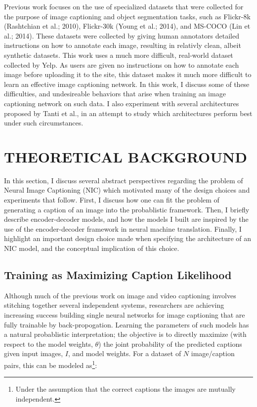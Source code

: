 \documentclass[letterpaper, 10 pt, conference]{ieeeconf}
\begin{document}
Previous work focuses on the use of specialized datasets that were collected for the purpose of image captioning and object segmentation tasks, such as Flickr-8k (Rashtchian et al.; 2010), Flickr-30k (Young et al.; 2014), and MS-COCO (Lin et al.; 2014). These datasets were collected by giving human annotators detailed instructions on how to annotate each image, resulting in relativly clean, albeit synthetic datasets. This work uses a much more difficult, real-world dataset collected by Yelp. As users are given no instructions on how to annotate each image before uploading it to the site, this dataset makes it much more difficult to learn an effective image captioning network. In this work, I discuss some of these difficulties, and undesireable behaviors that arise when training an image captioning network on such data. I also experiment with several architectures proposed by Tanti et al., in an attempt to study which architectures perform best under such circumstances.


\section{THEORETICAL BACKGROUND}

In this section, I discuss several abstract perspectives regarding the problem of Neural Image Captioning (NIC) which motivated many of the design choices and experiments that follow. First, I discuss how one can fit the problem of generating a caption of an image into the probablistic framework. Then, I briefly describe encoder-decoder models, and how the models I built are inspired by the use of the encoder-decoder  framework in neural machine translation. Finally, I highlight an important design choice made when specifying the architecture of an NIC model, and the conceptual implication of this choice. 

\subsection{Training as Maximizing Caption Likelihood}

Although much of the previous work on image and video captioning involves stitching together several independent systems, researchers are achieving increasing success building single neural networks for image captioning that are fully trainable by back-propogation. Learning the parameters of such models has a natural probablistic interpretation; the objective is to directly maximize (with respect to the model weights, $\theta$) the joint probability of the predicted captions given input images, $I$, and model weights. For a dataset of $N$ image/caption pairs, this can be modeled as\footnote{Under the assumption that the correct captions the images are mutually independent.}:
\end{document}
